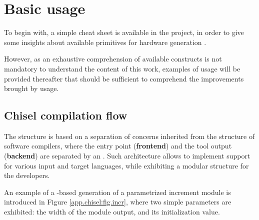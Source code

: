     \section*{Basic usage}
        To begin with, a simple cheat sheet is available in the project, in order to give some insights about available primitives for hardware generation \cite{chisel_cheatsheet_2021}.

        However, as an exhaustive comprehension of available constructs is not mandatory to understand the content of this work, examples of \chisel{} usage will be provided thereafter that should be sufficient to comprehend the improvements brought by  usage.

        \subsection*{Chisel compilation flow}
            The \chisel{}  structure is based on a separation of concerns inherited from the structure of software compilers, where the entry point ({\bf frontend}) and the tool output ({\bf backend}) are separated by an .
            Such architecture allows to implement support for various input and target languages, while exhibiting a modular structure for the developers.

            An example of a \chisel-based generation of a parametrized increment module is introduced in Figure \ref{app.chisel:fig.incr}, where two simple parameters are exhibited: the width of the module output, and its initialization value.

